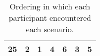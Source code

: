 \begin{table}[]
\begin{tabular}{|c|c|c|c|c|c|c|}
    25                                                       & 2                                                 & 1                                                 & 4                                                 & 6                                                 & 3                                                 & 5                                                 \\ \hline
    \end{tabular}
    \caption{Ordering in which each participant encountered each scenario. }
    \label{tab:ap:ordering}
\end{table}

\begin{sidewaystable}[]
    \center
    \scriptsize
    \begin{tabular}{|c|c|c|c|c|c|c|c|c|c|c|c|c|c|c|c|c|c|c|c|c|c|c|c|c|}
    \hline

\end{tabular}
\end{sidewaystable}
